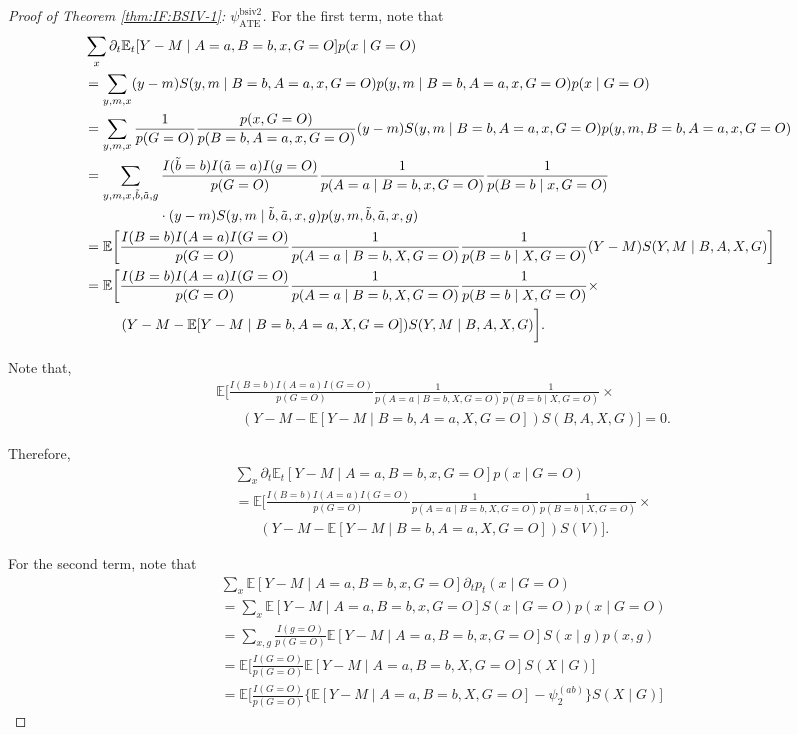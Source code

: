 \documentclass[10pt]{article}
\begin{document}
\begin{proof}[Proof of Theorem \ref{thm:IF:BSIV-1}: $\psi_{\text{ATE}}^{\text{bsiv2}}$]
For the first term, note that
{\footnotesize \begin{align*}
    &\sum_{x}\partial_t\mathbb{E}_t[Y-M\mid A=a,B=b,x,G=O]p(x\mid  G=O)\\
    &=\sum_{y,m,x}(y-m)S(y,m\mid B=b,A=a,x,G=O)p(y,m\mid B=b,A=a,x,G=O)p(x\mid G=O)\\
    &=\sum_{y,m,x}\frac{1}{p(G=O)}\frac{p(x, G=O)}{p(B=b,A=a,x,G=O)}(y-m)S(y,m\mid B=b,A=a,x,G=O)p(y,m, B=b,A=a,x,G=O)\\
    &=\sum_{y,m,x,\Tilde{b},\Tilde{a},g}\frac{I(\Tilde{b}=b)I(\Tilde{a}=a)I(g=O)}{p(G=O)}\frac{1}{p(A=a\mid B=b,x,G=O)}\frac{1}{p(B=b\mid x,G=O)}\\
    &~~~~~~~~~~~~~~~~\cdot(y-m)S(y,m\mid \Tilde{b},\Tilde{a},x,g)p(y,m, \Tilde{b},\Tilde{a},x,g)\\
    &=\mathbb{E}\bigg[\frac{I(B=b)I(A=a)I(G=O)}{p(G=O)}\frac{1}{p(A=a\mid B=b,X,G=O)}\frac{1}{p(B=b\mid X,G=O)}(Y-M)S(Y,M\mid B,A,X,G)\bigg]\\
    &=\mathbb{E}\bigg[\frac{I(B=b)I(A=a)I(G=O)}{p(G=O)}\frac{1}{p(A=a\mid B=b,X,G=O)}\frac{1}{p(B=b\mid X,G=O)}\times\\
    &\ \ \ \ \ \ \ \ (Y-M-\mathbb{E}[Y-M\mid B=b,A=a,X,G=O])S(Y,M\mid B,A,X,G)\bigg].
\end{align*}}

Note that,
\begin{align*}
    &\mathbb{E}\bigg[\frac{I(B=b)I(A=a)I(G=O)}{p(G=O)}\frac{1}{p(A=a\mid B=b,X,G=O)}\frac{1}{p(B=b\mid X,G=O)}\times\\
    &\ \ \ \ \ \ \ \ (Y-M-\mathbb{E}[Y-M\mid B=b,A=a,X,G=O])S(B,A,X,G)\bigg]=0.
\end{align*}

Therefore,
\begin{align*}
    &\sum_{x}\partial_t\mathbb{E}_t[Y-M\mid A=a,B=b,x,G=O]p(x\mid G=O)\\
    &=\mathbb{E}\bigg[\frac{I(B=b)I(A=a)I(G=O)}{p(G=O)}\frac{1}{p(A=a\mid B=b,X,G=O)}\frac{1}{p(B=b\mid X,G=O)}\times\\
    &\ \ \ \ \ \ \ \ (Y-M-\mathbb{E}[Y-M\mid B=b,A=a,X,G=O])S(V)\bigg].
\end{align*}

For the second term, note that
\begin{align*}
    &\sum_{x}\mathbb{E}[Y-M\mid A=a,B=b,x,G=O]\partial_tp_t(x\mid  G=O)\\
    &=\sum_{x}\mathbb{E}[Y-M\mid A=a,B=b,x,G=O]S(x\mid  G=O)p(x\mid G=O)\\
    &=\sum_{x,g}\frac{I(g=O)}{p( G=O)}\mathbb{E}[Y-M\mid A=a,B=b,x,G=O]S(x\mid g)p(x,g)\\
    &=\mathbb{E}\bigg[\frac{I(G=O)}{p(G=O)}\mathbb{E}[Y-M\mid A=a,B=b,X,G=O]S(X\mid G)\bigg]\\
    &=\mathbb{E}\bigg[\frac{I(G=O)}{p(G=O)}\bigg\{\mathbb{E}[Y-M\mid A=a,B=b,X,G=O]-\psi_2^{(ab)}\bigg\}S(X\mid G)\bigg]
\end{align*}


\end{proof}
\end{document}
